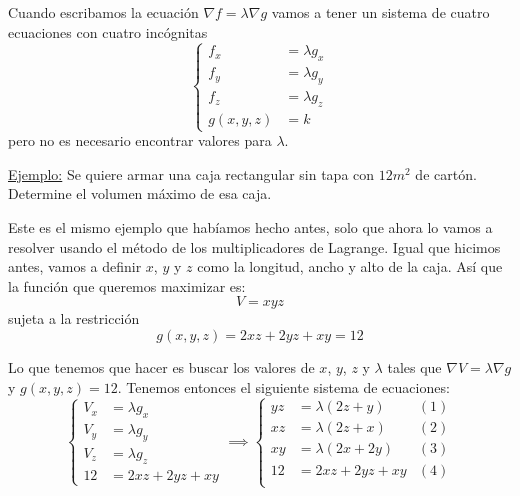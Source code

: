 \documentclass[12pt]{article}
\begin{document}
\vspace{0.2cm}
\vspace{0.2cm}

Cuando escribamos la ecuación $ \nabla f = \lambda \nabla g $ vamos a tener un sistema de cuatro ecuaciones con cuatro incógnitas
\[
  \left\{
  \begin{aligned}
	  f_{x} &= \lambda g_{x} \\
	  f_{y} &= \lambda g_{y} \\
	  f_{z} &= \lambda g_{z} \\
	  g(x,y,z) &= k
  \end{aligned}
  \right.
\]
pero no es necesario encontrar valores para $ \lambda $.


\underline{Ejemplo:} Se quiere armar una caja rectangular sin tapa con $ 12m^2 $ de cartón. Determine el volumen máximo de esa caja.

Este es el mismo ejemplo que habíamos hecho antes, solo que ahora lo vamos a resolver usando el método de los multiplicadores de Lagrange. Igual que hicimos antes, vamos a definir $ x $, $ y $ y $ z $ como la longitud, ancho y alto de la caja. Así que la función que queremos maximizar es:
\[
  V=xyz
\]
sujeta a la restricción
\[
  g(x,y,z)=2xz+2yz+xy=12
\]

Lo que tenemos que hacer es buscar los valores de $ x $, $ y $, $ z $ y $ \lambda $ tales que $ \nabla V = \lambda \nabla g $ y $ g(x,y,z)=12 $. Tenemos entonces el siguiente sistema de ecuaciones:
\[
  \left\{
  \begin{aligned}
	  V_{x} &= \lambda g_{x} \\
	  V_{y} &= \lambda g_{y} \\
	  V_{z} &= \lambda g_{z} \\
	  12 &=2xz + 2yz + xy 
  \end{aligned}
  \right. \implies \left\{
  \begin{aligned}
	  yz &= \lambda \left(2z+y\right) & (1)\\
	  xz &= \lambda \left(2z+x\right) & (2)\\
	  xy &= \lambda \left(2x+2y\right) & (3)\\
	  12 &=2xz + 2yz + xy & (4)\\
  \end{aligned}
  \right.
\]
\end{document}
